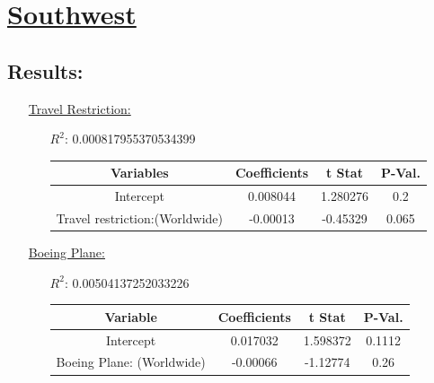 \documentclass[12pt]{report}
\begin{document}
\section*{\underline{Southwest}}
\subsection*{Results:}
\begin{enumerate}
    \item[\underline{Travel Restriction:}]
        \begin{enumerate}
            \item[$R^2$:]0.000817955370534399
            \item[]

                \begin{tabular}{|c|c|c|c|}
                    \toprule\hline
                    \textbf{Variables} & \textbf{Coefficients} & \textbf{t Stat} &\textbf{P-Val.} \\\hline

                    Intercept & 0.008044 & 1.280276 &0.2 \\\hline
                    Travel restriction:(Worldwide) & -0.00013 & -0.45329 &0.065\\\hline
                    \bottomrule
                \end{tabular}




        \end{enumerate}
    \item[\underline{Boeing Plane:}]
        \begin{enumerate}
            \item[$R^2$:]0.00504137252033226
            \item[]

                \begin{tabular}{|c|c|c|c|}
                    \toprule\hline
                    \textbf{Variable} & \textbf{Coefficients} & \textbf{t Stat}&\textbf{P-Val.} \\ \hline

                    Intercept & 0.017032 & 1.598372 &0.1112 \\ \hline
                    Boeing Plane: (Worldwide) & -0.00066 & -1.12774 & 0.26\\ \hline
                    \bottomrule
                \end{tabular}





\end{enumerate}
\end{enumerate}
\end{document}
